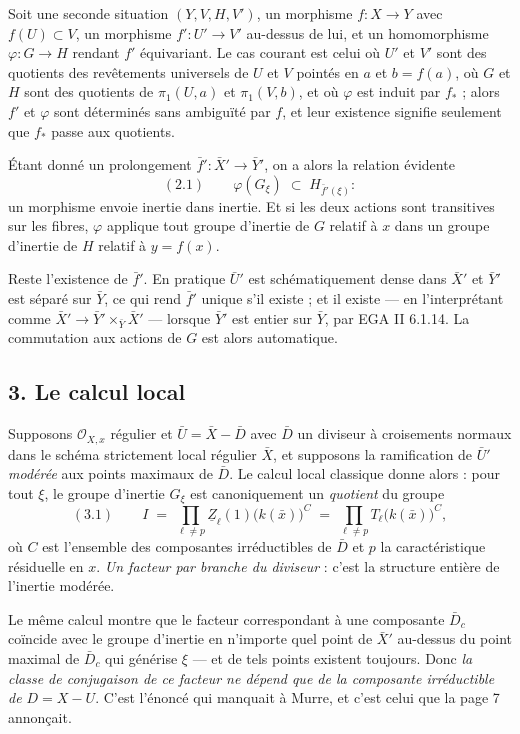 \documentclass[11pt,a4paper]{article}
\begin{document}
Soit une seconde situation $(Y, V, H, V')$, un morphisme $f : X \to Y$ avec
$f(U) \subset V$, un morphisme $f' : U' \to V'$ au-dessus de lui, et un
homomorphisme $\varphi : G \to H$ rendant $f'$ équivariant. Le cas courant est
celui où $U'$ et $V'$ sont des quotients des revêtements universels de $U$ et
$V$ pointés en $a$ et $b = f(a)$, où $G$ et $H$ sont des quotients de
$\pi_{1}(U,a)$ et $\pi_{1}(V,b)$, et où $\varphi$ est induit par
$f_{*}$ ; alors $f'$ et $\varphi$ sont déterminés sans ambiguïté par $f$, et
leur existence signifie seulement que $f_{*}$ passe aux quotients.

Étant donné un prolongement $\bar{f}' : \bar{X}' \to \bar{Y}'$, on a alors la
relation évidente
\[
  (2.1) \qquad \varphi(G_{\xi}) \;\subset\; H_{\bar{f}'(\xi)} :
\]
un morphisme envoie inertie dans inertie. Et si les deux actions sont
transitives sur les fibres, $\varphi$ applique tout groupe d'inertie de $G$
relatif à $x$ dans un groupe d'inertie de $H$ relatif à $y = f(x)$.

Reste l'existence de $\bar{f}'$. En pratique $\bar{U}'$ est schématiquement
dense dans $\bar{X}'$ et $\bar{Y}'$ est séparé sur $\bar{Y}$, ce qui rend
$\bar{f}'$ unique s'il existe ; et il existe --- en l'interprétant comme
$\bar{X}' \to \bar{Y}' \times_{\bar{Y}} \bar{X}'$ --- lorsque $\bar{Y}'$ est
entier sur $\bar{Y}$, par EGA II 6.1.14. La commutation aux actions de $G$ est
alors automatique.

\subsection*{3. Le calcul local}

Supposons $\mathcal{O}_{X,x}$ régulier et $\bar{U} = \bar{X} - \bar{D}$ avec
$\bar{D}$ un diviseur à croisements normaux dans le schéma strictement local
régulier $\bar{X}$, et supposons la ramification de $\bar{U}'$ \emph{modérée}
aux points maximaux de $\bar{D}$. Le calcul local classique donne alors : pour
tout $\xi$, le groupe d'inertie $G_{\xi}$ est canoniquement un \emph{quotient}
du groupe
\[
  (3.1) \qquad I \;=\; \prod_{\ell \neq p}
  \underline{Z}_{\ell}(1)\bigl(k(\bar{x})\bigr)^{C}
  \;=\; \prod_{\ell \neq p} T_{\ell}\bigl(k(\bar{x})\bigr)^{C} ,
\]
où $C$ est l'ensemble des composantes irréductibles de $\bar{D}$ et $p$ la
caractéristique résiduelle en $x$. \emph{Un facteur par branche du diviseur} :
c'est la structure entière de l'inertie modérée.

Le même calcul montre que le facteur correspondant à une composante
$\bar{D}_{c}$ coïncide avec le groupe d'inertie en n'importe quel point de
$\bar{X}'$ au-dessus du point maximal de $\bar{D}_{c}$ qui générise $\xi$ ---
et de tels points existent toujours. Donc \emph{la classe de conjugaison de ce
facteur ne dépend que de la composante irréductible de $D = X - U$}. C'est
l'énoncé qui manquait à Murre, et c'est celui que la page 7 annonçait.
\end{document}
